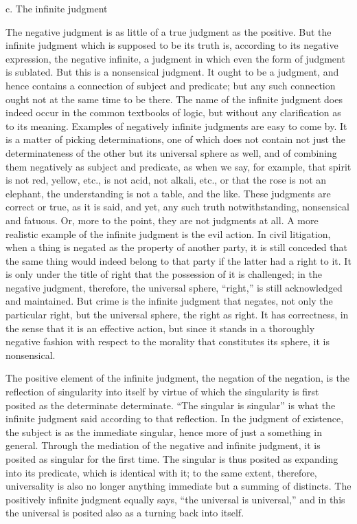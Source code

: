 c. The infinite judgment

The negative judgment is as little of a true judgment as the positive.
But the infinite judgment which is supposed to be its truth is,
according to its negative expression, the negative infinite,
a judgment in which even the form of judgment is sublated.
But this is a nonsensical judgment.
It ought to be a judgment,
and hence contains a connection of subject and predicate;
but any such connection ought not at the same time to be there.
The name of the infinite judgment does indeed
occur in the common textbooks of logic,
but without any clarification as to its meaning.
Examples of negatively infinite judgments are easy to come by.
It is a matter of picking determinations,
one of which does not contain not just
the determinateness of the other
but its universal sphere as well,
and of combining them negatively as subject and predicate,
as when we say, for example,
that spirit is not red, yellow, etc.,
is not acid, not alkali, etc.,
or that the rose is not an elephant,
the understanding is not a table, and the like.
These judgments are correct or true,
as it is said, and yet, any such truth
notwithstanding, nonsensical and fatuous.
Or, more to the point, they are not judgments at all.
A more realistic example of
the infinite judgment is the evil action.
In civil litigation, when a thing is negated
as the property of another party,
it is still conceded that the same thing would indeed belong
to that party if the latter had a right to it.
It is only under the title of right
that the possession of it is challenged;
in the negative judgment, therefore,
the universal sphere, “right,” is
still acknowledged and maintained.
But crime is the infinite judgment that negates,
not only the particular right,
but the universal sphere, the right as right.
It has correctness, in the sense that it is an effective action,
but since it stands in a thoroughly negative fashion
with respect to the morality that constitutes its sphere,
it is nonsensical.

The positive element of the infinite judgment,
the negation of the negation,
is the reflection of singularity into itself
by virtue of which the singularity is
first posited as the determinate determinate.
“The singular is singular” is what
the infinite judgment said
according to that reflection.
In the judgment of existence,
the subject is as the immediate singular,
hence more of just a something in general.
Through the mediation of
the negative and infinite judgment,
it is posited as singular for the first time.
The singular is thus posited as
expanding into its predicate,
which is identical with it;
to the same extent, therefore,
universality is also no longer
anything immediate but a summing of distincts.
The positively infinite judgment equally says,
“the universal is universal,”
and in this the universal is posited
also as a turning back into itself.

